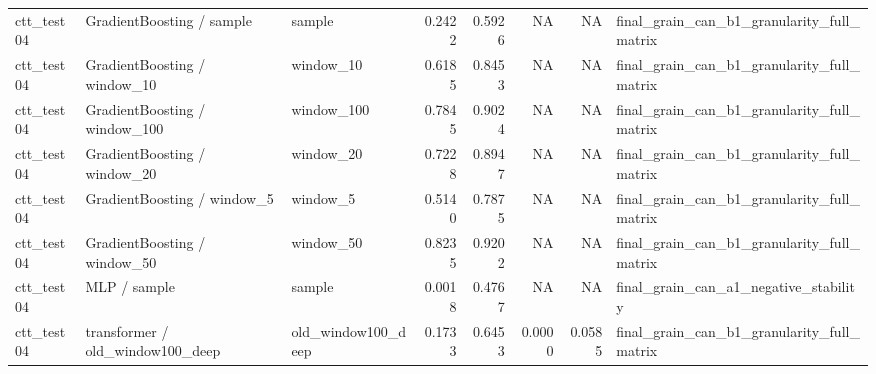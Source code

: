 \begin{tabular}{lllrrrrl}
ctt\_test04 & GradientBoosting / sample & sample & 0.2422 & 0.5926 & NA & NA & final\_grain\_can\_b1\_granularity\_full\_matrix \\
ctt\_test04 & GradientBoosting / window\_10 & window\_10 & 0.6185 & 0.8453 & NA & NA & final\_grain\_can\_b1\_granularity\_full\_matrix \\
ctt\_test04 & GradientBoosting / window\_100 & window\_100 & 0.7845 & 0.9024 & NA & NA & final\_grain\_can\_b1\_granularity\_full\_matrix \\
ctt\_test04 & GradientBoosting / window\_20 & window\_20 & 0.7228 & 0.8947 & NA & NA & final\_grain\_can\_b1\_granularity\_full\_matrix \\
ctt\_test04 & GradientBoosting / window\_5 & window\_5 & 0.5140 & 0.7875 & NA & NA & final\_grain\_can\_b1\_granularity\_full\_matrix \\
ctt\_test04 & GradientBoosting / window\_50 & window\_50 & 0.8235 & 0.9202 & NA & NA & final\_grain\_can\_b1\_granularity\_full\_matrix \\
ctt\_test04 & MLP / sample & sample & 0.0018 & 0.4767 & NA & NA & final\_grain\_can\_a1\_negative\_stability \\
ctt\_test04 & transformer / old\_window100\_deep & old\_window100\_deep & 0.1733 & 0.6453 & 0.0000 & 0.0585 & final\_grain\_can\_b1\_granularity\_full\_matrix \\
\bottomrule
\end{tabular}
